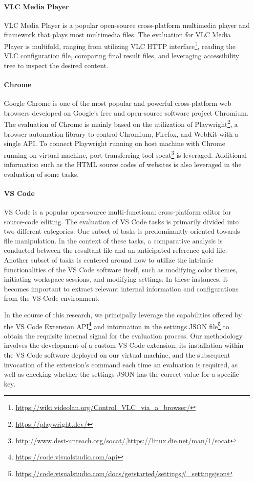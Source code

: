 \paragraph{VLC Media Player}
VLC Media Player is a popular open-source cross-platform multimedia player and framework that plays most multimedia files. The evaluation for VLC Media Player is multifold, ranging from utilizing VLC HTTP interface\footnote{\url{https://wiki.videolan.org/Control_VLC_via_a_browser/}}, reading the VLC configuration file, comparing final result files, and leveraging accessibility tree to inspect the desired content.

\paragraph{Chrome}
Google Chrome is one of the most popular and powerful cross-platform web browsers developed on Google's free and open-source software project Chromium. 
The evaluation of Chrome is mainly based on the utilization of Playwright\footnote{\url{https://playwright.dev/}}, a browser automation library to control Chromium, Firefox, and WebKit with a single API. To connect Playwright running 
on host machine with Chrome running on virtual machine, port transferring tool 
socat\footnote{\url{http://www.dest-unreach.org/socat/},\url{https://linux.die.net/man/1/socat}} 
is leveraged. Additional information such as the HTML source codes of websites is also leveraged in the evaluation of some tasks.

\paragraph{VS Code}
VS Code is a popular open-source multi-functional cross-platform editor for source-code editing. 
The evaluation of VS Code tasks is primarily divided into two different categories. One subset of tasks is predominantly oriented towards file manipulation. 
In the context of these tasks, a comparative analysis is conducted between the resultant file and an anticipated reference gold file. 
Another subset of tasks is centered around how to utilize the intrinsic functionalities of the VS Code software itself, such as modifying color themes, initiating workspace sessions, and modifying settings. 
In these instances, it becomes important to extract relevant internal information and configurations from the VS Code environment.

In the course of this research, we principally leverage the capabilities offered by the VS Code Extension API\footnote{\url{https://code.visualstudio.com/api}} and information in the settings JSON file\footnote{\url{https://code.visualstudio.com/docs/getstarted/settings\#_settingsjson}} to obtain the requisite internal signal for the evaluation process. Our methodology involves the development of a custom VS Code extension, its installation within the VS Code software deployed on our virtual machine, and the subsequent invocation of the extension's command each time an evaluation is required, as well as checking whether the settings JSON has the correct value for a specific key.

